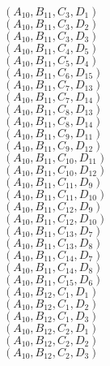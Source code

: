 \documentclass[14pt]{article}
\begin{document}
    $({A}_{10}, {B}_{11}, {C}_{3}, {D}_{1}) $ \\ 
    $({A}_{10}, {B}_{11}, {C}_{3}, {D}_{2}) $ \\ 
    $({A}_{10}, {B}_{11}, {C}_{3}, {D}_{3}) $ \\ 
    $({A}_{10}, {B}_{11}, {C}_{4}, {D}_{5}) $ \\ 
    $({A}_{10}, {B}_{11}, {C}_{5}, {D}_{4}) $ \\ 
    $({A}_{10}, {B}_{11}, {C}_{6}, {D}_{15}) $ \\ 
    $({A}_{10}, {B}_{11}, {C}_{7}, {D}_{13}) $ \\ 
    $({A}_{10}, {B}_{11}, {C}_{7}, {D}_{14}) $ \\ 
    $({A}_{10}, {B}_{11}, {C}_{8}, {D}_{13}) $ \\ 
    $({A}_{10}, {B}_{11}, {C}_{8}, {D}_{14}) $ \\ 
    $({A}_{10}, {B}_{11}, {C}_{9}, {D}_{11}) $ \\ 
    $({A}_{10}, {B}_{11}, {C}_{9}, {D}_{12}) $ \\ 
    $({A}_{10}, {B}_{11}, {C}_{10}, {D}_{11}) $ \\ 
    $({A}_{10}, {B}_{11}, {C}_{10}, {D}_{12}) $ \\ 
    $({A}_{10}, {B}_{11}, {C}_{11}, {D}_{9}) $ \\ 
    $({A}_{10}, {B}_{11}, {C}_{11}, {D}_{10}) $ \\ 
    $({A}_{10}, {B}_{11}, {C}_{12}, {D}_{9}) $ \\ 
    $({A}_{10}, {B}_{11}, {C}_{12}, {D}_{10}) $ \\ 
    $({A}_{10}, {B}_{11}, {C}_{13}, {D}_{7}) $ \\ 
    $({A}_{10}, {B}_{11}, {C}_{13}, {D}_{8}) $ \\ 
    $({A}_{10}, {B}_{11}, {C}_{14}, {D}_{7}) $ \\ 
    $({A}_{10}, {B}_{11}, {C}_{14}, {D}_{8}) $ \\ 
    $({A}_{10}, {B}_{11}, {C}_{15}, {D}_{6}) $ \\ 
    $({A}_{10}, {B}_{12}, {C}_{1}, {D}_{1}) $ \\ 
    $({A}_{10}, {B}_{12}, {C}_{1}, {D}_{2}) $ \\ 
    $({A}_{10}, {B}_{12}, {C}_{1}, {D}_{3}) $ \\ 
    $({A}_{10}, {B}_{12}, {C}_{2}, {D}_{1}) $ \\ 
    $({A}_{10}, {B}_{12}, {C}_{2}, {D}_{2}) $ \\ 
    $({A}_{10}, {B}_{12}, {C}_{2}, {D}_{3}) $ \\ 
\end{document}

